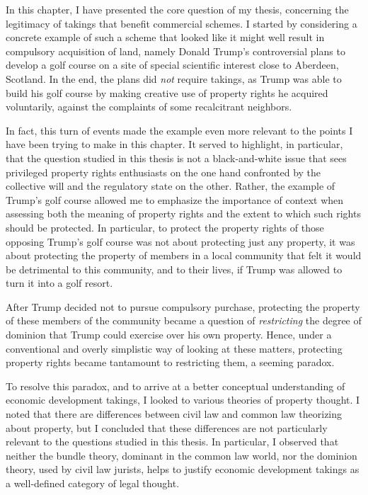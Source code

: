 In this chapter, I have presented the core question of my thesis, concerning the legitimacy of takings that benefit commercial schemes. I started by considering a concrete example of such a scheme that looked like it might well result in compulsory acquisition of land, namely Donald Trump's controversial plans to develop a golf course on a site of special scientific interest close to Aberdeen, Scotland. In the end, the plans did {\it not} require takings, as Trump was able to build his golf course by making creative use of property rights he acquired voluntarily, against the complaints of some recalcitrant neighbors. 

In fact, this turn of events made the example even more relevant to the points I have been trying to make in this chapter. It served to highlight, in particular, that the question studied in this thesis is not a black-and-white issue that sees privileged property rights enthusiasts on the one hand confronted by the collective will and the regulatory state on the other. Rather, the example of Trump's golf course allowed me to emphasize the importance of context when assessing both the meaning of property rights and the extent to which such rights should be protected. In particular, to protect the property rights of those opposing Trump's golf course was not about protecting just any property, it was about protecting the property of members in a local community that felt it would be detrimental to this community, and to their lives, if Trump was allowed to turn it into a golf resort. 

After Trump decided not to pursue compulsory purchase, protecting the property of these members of the community became a question of {\it restricting} the degree of dominion that Trump could exercise over his own property. Hence, under a conventional and overly simplistic way of looking at these matters, protecting property rights became tantamount to restricting them, a seeming paradox. 

To resolve this paradox, and to arrive at a better conceptual understanding of economic development takings, I looked to various theories of property thought. I noted that there are differences between civil law and common law theorizing about property, but I concluded that these differences are not particularly relevant to the questions studied in this thesis. In particular, I observed that neither the bundle theory, dominant in the common law world, nor the dominion theory, used by civil law jurists, helps to justify economic development takings as a well-defined category of legal thought. 

